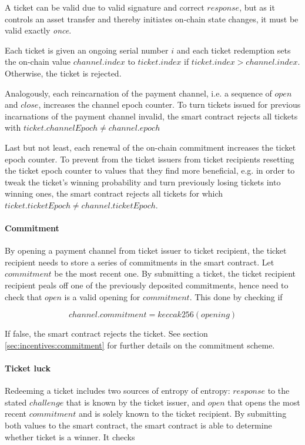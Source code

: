 A ticket can be valid due to valid signature and correct $response$, but as it controls an asset transfer and thereby initiates on-chain state changes, it must be valid exactly \textit{once}.

Each ticket is given an ongoing serial number $i$ and each ticket redemption sets the on-chain value $channel.index$ to $ticket.index$ if $ticket.index > channel.index$. Otherwise, the ticket is rejected.

Analogously, each reincarnation of the payment channel, i.e. a sequence of $open$ and $close$, increases the channel epoch counter. To turn tickets issued for previous incarnations of the payment channel invalid, the smart contract rejects all tickets with $ticket.channelEpoch \neq channel.epoch$

Last but not least, each renewal of the on-chain commitment increases the ticket epoch counter. To prevent from the ticket issuers from ticket recipients resetting the ticket epoch counter to values that they find more beneficial, e.g. in order to tweak the ticket's winning probability and turn previously losing tickets into winning ones, the smart contract rejects all tickets for which $ticket.ticketEpoch \neq channel.ticketEpoch$.

\paragraph{Commitment}

By opening a payment channel from ticket issuer to ticket recipient, the ticket recipient needs to store a series of commitments in the smart contract. Let $commitment$ be the most recent one. By submitting a ticket, the ticket recipient recipient peals off one of the previously deposited commitments, hence need to check that $open$ is a valid opening for $commitment$. This done by checking if

$$ channel.commitment = keccak256 (opening)$$

If false, the smart contract rejects the ticket. See section \ref{sec:incentives:commitment} for further details on the commitment scheme.

\paragraph{Ticket luck}
\label{sec:tickets:redemption:ticketluck}

Redeeming a ticket includes two sources of entropy of entropy: $response$ to the stated $challenge$ that is known by the ticket issuer, and $open$ that opens the most recent $commitment$ and is solely known to the ticket recipient. By submitting both values to the smart contract, the smart contract is able to determine whether ticket is a winner. It checks

